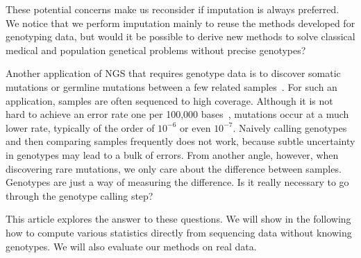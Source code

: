 \documentclass{bioinfo}
\begin{document}
These potential concerns make us reconsider if imputation is always preferred.
We notice that we perform imputation mainly to reuse the methods developed for
genotyping data, but would it be possible to derive new methods to solve
classical medical and population genetical problems without precise genotypes?

Another application of NGS that requires genotype data is to discover somatic
mutations or germline mutations between a few related
samples~\citep{Ley:2008ve,Mardis:2009qf,Shah:2009cr,Pleasance:2010bh,Pleasance:2010dq,Roach:2010oq,Conrad:2011kx}.
For such an application, samples are often sequenced to high coverage.
Although it is not hard to achieve an error rate one per 100,000
bases~\citep{Bentley:2008cr}, mutations occur at a much lower rate, typically
of the order of $10^{-6}$ or even $10^{-7}$. Naively calling genotypes and then
comparing samples frequently does not work, because subtle uncertainty in
genotypes may lead to a bulk of errors. From another angle, however, when
discovering rare mutations, we only care about the difference between samples.
Genotypes are just a way of measuring the difference. Is it really necessary to
go through the genotype calling step?

This article explores the answer to these questions. We will show in the
following how to compute various statistics directly from sequencing data
without knowing genotypes. We will also evaluate our methods on real data.
\end{document}
